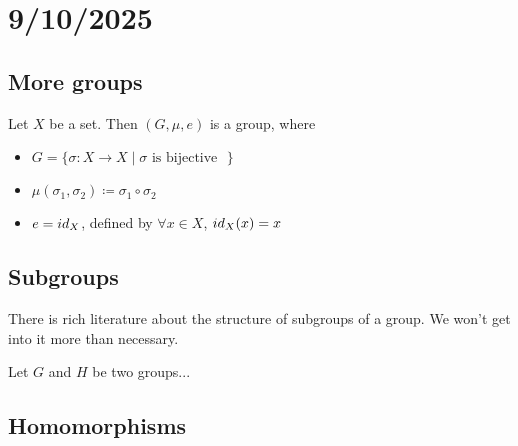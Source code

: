 \section{9/10/2025}

\subsection{More groups}

\begin{example}
    Let $X$ be a set. Then $(G,\mu,e)$ is a group, where
    \begin{itemize}
        \item $G = \{ \text{$\sigma:X\to X \mid \text{$\sigma$ is bijective}$ } \}$ %
        \item $\mu(\sigma_1,\sigma_2) \coloneq \sigma_1\circ\sigma_2$
        \item $e = id_X$, defined by $\forall x\in X$, $id_X(x) = x$
    \end{itemize}
\end{example}


\subsection{Subgroups}
There is rich literature about the structure of subgroups of a group.
We won't get into it more than necessary.
\begin{definition}
    Let $G$ and $H$ be two groups...
\end{definition}


\subsection{Homomorphisms}

\begin{example}[$\det$]
    
\end{example}


\begin{example}[$n \mapsto kn$]
    
\end{example}



